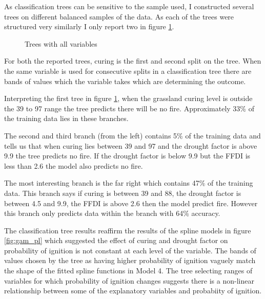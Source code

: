 \documentclass{article}
\begin{document}
As classification trees can be sensitive to the sample used, I constructed several trees on different balanced samples of the data. As each of the trees were structured very similarly I only report two in figure \ref{fig:tree2}. 

\begin{figure}[h]
	\centering 
	\caption{Trees with all variables} 
	\label{fig:tree2} 
\end{figure}

For both the reported trees, curing is the first and second split on the tree. When the same variable is used for consecutive splits in a classification tree there are bands of values which the variable takes which are determining the outcome. 

Interpreting the first tree in figure \ref{fig:tree2}, when the grassland curing level is outside the 39 to 97 range the tree predicts there will be no fire. Approximately 33\% of the training data lies in these branches. 

The second and third branch (from the left) contains 5\% of the training data and tells us that when curing lies between 39 and 97 and the drought factor is above 9.9 the tree predicts no fire. If the drought factor is below 9.9 but the FFDI is less than 2.6 the model also predicts no fire. 

The most interesting branch is the far right which contains 47\% of the training data. This branch says if curing is between 39 and 88, the drought factor is between 4.5 and 9.9, the FFDI is above 2.6 then the model predict fire. However this branch only predicts data within the branch with 64\% accuracy. 

The classification tree results reaffirm the results of the spline models in figure \ref{fig:gam_pl} which suggested the effect of curing and drought factor on probability of ignition is not constant at each level of the variable. The bands of values chosen by the tree as having higher probability of ignition vaguely match the shape of the fitted spline functions in Model 4. The tree selecting ranges of variables for which probability of ignition changes suggests there is a  non-linear relationship between some of the explanatory variables and probabiity of ignition. 

\end{document}
